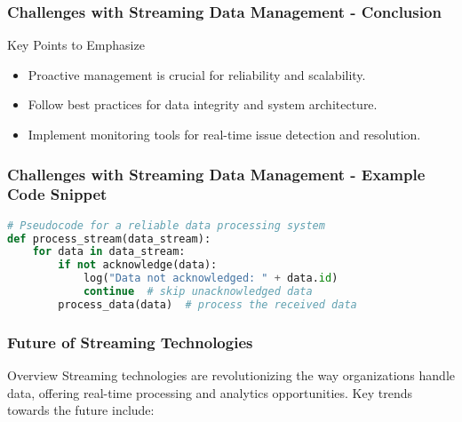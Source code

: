 \documentclass[aspectratio=169]{beamer}
\begin{document}
\begin{frame}[fragile]
    \frametitle{Challenges with Streaming Data Management - Conclusion}
    \begin{block}{Key Points to Emphasize}
        \begin{itemize}
            \item Proactive management is crucial for reliability and scalability.
            \item Follow best practices for data integrity and system architecture.
            \item Implement monitoring tools for real-time issue detection and resolution.
        \end{itemize}
    \end{block}
\end{frame}

\begin{frame}[fragile]
    \frametitle{Challenges with Streaming Data Management - Example Code Snippet}
    \begin{lstlisting}[language=Python]
# Pseudocode for a reliable data processing system
def process_stream(data_stream):
    for data in data_stream:
        if not acknowledge(data):
            log("Data not acknowledged: " + data.id)
            continue  # skip unacknowledged data
        process_data(data)  # process the received data
    \end{lstlisting}
\end{frame}

\begin{frame}[fragile]
    \frametitle{Future of Streaming Technologies}
    \begin{block}{Overview}
        Streaming technologies are revolutionizing the way organizations handle data, 
        offering real-time processing and analytics opportunities. 
        Key trends towards the future include:
    \end{block}
\end{frame}
\end{document}
